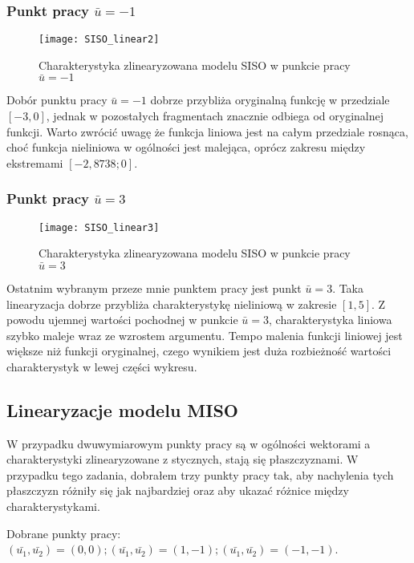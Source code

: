 \documentclass[11pt,a4paper]{article}
\begin{document}
\subsubsection{Punkt pracy $\bar{u} = -1$}

\begin{figure}[h]
\texttt{[image: SISO\_linear2]}
\caption{Charakterystyka zlinearyzowana modelu SISO w punkcie pracy $\bar{u} = -1$}
\end{figure}

\indent \indent Dobór punktu pracy $\bar{u} = -1$ dobrze przybliża oryginalną funkcję w przedziale $[-3,0]$, jednak w pozostałych fragmentach znacznie odbiega od oryginalnej funkcji. Warto zwrócić uwagę że funkcja liniowa jest na całym przedziale rosnąca, choć funkcja nieliniowa w ogólności jest malejąca, oprócz zakresu między ekstremami $[-2,8738;0]$.
\newpage

\subsubsection{Punkt pracy $\bar{u} = 3$}

\begin{figure}[h]
\texttt{[image: SISO\_linear3]}
\caption{Charakterystyka zlinearyzowana modelu SISO w punkcie pracy $\bar{u} = 3$}
\end{figure}

\indent \indent Ostatnim wybranym przeze mnie punktem pracy jest punkt $\bar{u} = 3$. Taka linearyzacja dobrze przybliża charakterystykę nieliniową w zakresie $[1,5]$. Z powodu ujemnej wartości pochodnej w punkcie $\bar{u} = 3$, charakterystyka liniowa szybko maleje wraz ze wzrostem argumentu. Tempo malenia funkcji liniowej jest większe niż funkcji oryginalnej, czego wynikiem jest duża rozbieżność wartości charakterystyk w lewej części wykresu.
\newpage
   
\subsection{Linearyzacje modelu MISO}
\indent \indent W przypadku dwuwymiarowym punkty pracy są w ogólności wektorami a  charakterystyki zlinearyzowane z stycznych, stają się płaszczyznami. W przypadku tego zadania, dobrałem trzy punkty pracy tak, aby nachylenia tych płaszczyzn różniły się jak najbardziej oraz aby ukazać różnice między charakterystykami.
\begin{center}
Dobrane punkty pracy: $(\bar{u_{1}},\bar{u_{2}}) = (0,0); (\bar{u_{1}},\bar{u_{2}}) = (1,-1); (\bar{u_{1}},\bar{u_{2}}) = (-1,-1)$.
\end{center}
\flushleft
\end{document}
